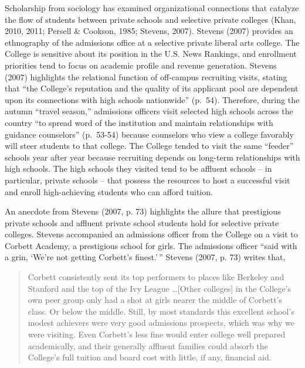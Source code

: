 \documentclass[
  12pt,
]{article}
\begin{document}
Scholarship from sociology has examined organizational connections that catalyze the flow of students between private schools and selective private colleges (Khan, 2010, 2011; Persell \& Cookson, 1985; Stevens, 2007). Stevens (2007) provides an ethnography of the admissions office at a selective private liberal arts college. The College is sensitive about its position in the U.S. News Rankings, and enrollment priorities tend to focus on academic profile and revenue generation. Stevens (2007) highlights the relational function of off-campus recruiting visits, stating that ``the College's reputation and the quality of its applicant pool are dependent upon its connections with high schools nationwide'' (p.~54). Therefore, during the autumn ``travel season,'' admissions officers visit selected high schools across the country ``to spread word of the institution and maintain relationships with guidance counselors'' (p.~53-54) because counselors who view a college favorably will steer students to that college. The College tended to visit the same ``feeder'' schools year after year because recruiting depends on long-term relationships with high schools. The high schools they visited tend to be affluent schools -- in particular, private schools -- that possess the resources to host a successful visit and enroll high-achieving students who can afford tuition.

An anecdote from Stevens (2007, p. 73) highlights the allure that prestigious private schools and affluent private school students hold for selective private colleges. Stevens accompanied an admissions officer from the College on a visit to Corbett Academy, a prestigious school for girls. The admissions officer ``said with a grin, `We're not getting Corbett's finest.'\,'' Stevens (2007, p. 73) writes that,

\begin{quote}
Corbett consistently sent its top performers to places like Berkeley and Stanford and the top of the Ivy League \ldots {[}Other colleges{]} in the College's own peer group only had a shot at girls nearer the middle of Corbett's class. Or below the middle. Still, by most standards this excellent school's modest achievers were very good admissions prospects, which was why we were visiting. Even Corbett's less fine would enter college well prepared academically, and their generally affluent families could absorb the College's full tuition and board cost with little, if any, financial aid.
\end{quote}
\end{document}
